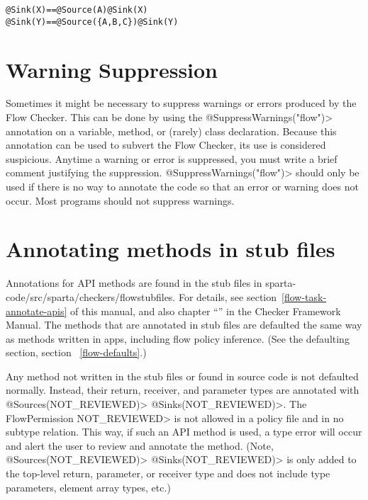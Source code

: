 \begin{alltt}
  @Sink(X)                   ==   @Source(A) @Sink(X)
  @Sink(Y)                   ==   @Source(\{A,B,C\}) @Sink(Y)
\end{alltt}


\section{Warning Suppression\label{sec:waringsuppression}}
 
Sometimes it might be necessary to suppress warnings or errors produced by
the Flow Checker.  This can be done by using the
\<@SuppressWarnings("flow")> annotation on a variable, method, or (rarely)
class declaration.  Because this annotation can be used to subvert the Flow
Checker, its use is considered suspicious.  Anytime a warning or error is
suppressed, you must write a brief comment justifying the suppression.
\<@SuppressWarnings("flow")> should only be used if there is no way to
annotate the code so that an error or warning does not occur.  Most
programs should not suppress warnings.


\section{Annotating methods in stub files\label{sec:apispecs}}

Annotations for API methods are found in the stub files in sparta-code/src/sparta/checkers/flowstubfiles.
For details, see section~\ref{flow-task-annotate-apis} of this manual, and also 
chapter
``'' in the Checker Framework Manual.  
 The methods that are annotated in stub files are defaulted the same way as methods written in apps, including flow policy inference.  (See the defaulting section, section ~\ref{flow-defaults}.) 

Any method not written in the stub files or found in source code is not defaulted normally. 
 Instead, their return, receiver, and parameter types are annotated with \<@Sources(NOT\_REVIEWED)> 
 \<@Sinks(NOT\_REVIEWED)>.  The FlowPermission \<NOT\_REVIEWED> is not allowed 
 in a policy file and in no subtype relation.  This way, if such an API method is used, a type error
  will occur and alert the user to review and annotate the method.  (Note, \<@Sources(NOT\_REVIEWED)> 
  \<@Sinks(NOT\_REVIEWED)> is only added to the top-level return, parameter, or receiver type and does not
   include type parameters, element array types, etc.)

